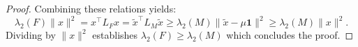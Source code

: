 \documentclass[10pt,a4paper]{amsart}
\begin{document}
\begin{proof}
Combining these relations yields:
\begin{equation}
    \lambda_2(F)\|x\|^2 = x^\top L_F x = \tilde{x}^\top L_M \tilde{x} \geq \lambda_2(M) \|\tilde{x} - \mu\mathbf{1}\|^2 \geq \lambda_2(M)\|x\|^2.
\end{equation}
Dividing by $\|x\|^2$ establishes $\lambda_2(F) \geq \lambda_2(M)$ which concludes the proof.
\end{proof}
\end{document}
